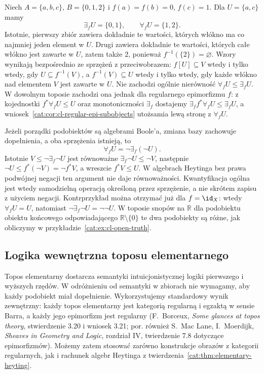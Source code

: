 \begin{przyklad}\label{cat:ex:cl-quantifiers-set}
Niech $A=\{a,b,c\}$, $B=\{0,1,2\}$ i $f(a)=f(b)=0$, $f(c)=1$. Dla $U=\{a,c\}$ mamy
\[
 \exists_f U=\{0,1\},\qquad \forall_f U=\{1,2\}.
\]
Istotnie, pierwszy zbiór zawiera dokładnie te wartości, których włókno ma co najmniej jeden element w $U$. Drugi zawiera dokładnie te wartości, których całe włókno jest zawarte w $U$, zatem także $2$, ponieważ $f^{-1}(\{2\})=\varnothing$. Wzory wynikają bezpośrednio ze sprzężeń z przeciwobrazem: $f[U]\subseteq V$ wtedy i tylko wtedy, gdy $U\subseteq f^{-1}(V)$, a $f^{-1}(V)\subseteq U$ wtedy i tylko wtedy, gdy każde włókno nad elementem $V$ jest zawarte w $U$. Nie zachodzi ogólnie nierówność $\forall_f U\leq\exists_f U$. W dowolnym toposie zachodzi ona jednak dla regularnego epimorfizmu $f$: z kojednostki $f^*\forall_f U\leq U$ oraz monotoniczności $\exists_f$ dostajemy $\exists_f f^*\forall_f U\leq\exists_f U$, a wniosek~\ref{cat:cor:cl-regular-epi-subobjects} utożsamia lewą stronę z $\forall_f U$.
\end{przyklad}

\begin{uwaga}\label{cat:rem:cl-quantifier-duality}
Jeżeli porządki podobiektów są algebrami Boole'a, zmiana bazy zachowuje dopełnienia, a oba sprzężenia istnieją, to
\[
 \forall_f U=\neg\exists_f(\neg U).
\]
Istotnie $V\leq\neg\exists_f\neg U$ jest równoważne $\exists_f\neg U\leq\neg V$, następnie $\neg U\leq f^*(\neg V)=\neg f^*V$, a wreszcie $f^*V\leq U$. W algebrach Heytinga bez prawa podwójnej negacji ten argument nie daje równoważności. Kwantyfikacja ogólna jest wtedy samodzielną operacją określoną przez sprzężenie, a nie skrótem zapisu z użyciem negacji. Kontrprzykład można otrzymać już dla $f=\id_X$: wtedy $\forall_f U=U$, natomiast $\neg\exists_f\neg U=\neg\neg U$. W toposie snopów na $\mathbb R$ dla podobiektu obiektu końcowego odpowiadającego $\mathbb R\setminus\{0\}$ te dwa podobiekty są różne, jak obliczymy w przykładzie~\ref{cat:ex:cl-open-truth}.
\end{uwaga}

\subsection{Logika wewnętrzna toposu elementarnego}

Topos elementarny dostarcza semantyki intuicjonistycznej logiki pierwszego i wyższych rzędów. W odróżnieniu od semantyki w zbiorach nie wymagamy, aby każdy podobiekt miał dopełnienie. Wykorzystujemy standardowy wynik zewnętrzny: każdy topos elementarny jest kategorią regularną i egzaktą w sensie Barra, a każdy jego epimorfizm jest regularny (F.~Borceux, \emph{Some glances at topos theory}, stwierdzenie 3.20 i wniosek 3.21; por. również S.~Mac Lane, I.~Moerdijk, \emph{Sheaves in Geometry and Logic}, rozdział IV, twierdzenie 7.8 dotyczące epimorfizmów). Możemy zatem stosować zarówno konstrukcje obrazów z kategorii regularnych, jak i rachunek algebr Heytinga z twierdzenia~\ref{cat:thm:elementary-heyting}.

